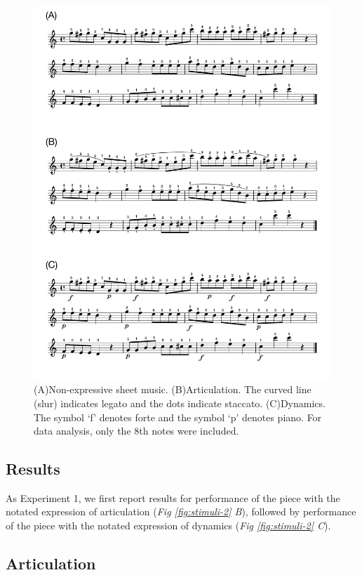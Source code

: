 \documentclass[
  english,
  man,floatsintext]{apa6}
\begin{document}
\begin{figure}
\includegraphics[width=1\linewidth]{manuscript_files/figure-latex/stim-2-1} \caption{\label{fig:stimuli-2}(A)Non-expressive sheet music. (B)Articulation. The curved line (slur) indicates legato and the dots indicate staccato. (C)Dynamics. The symbol `f' denotes forte and the symbol `p' denotes piano. For data analysis, only the 8th notes were included.}\label{fig:stim-2}
\end{figure}

\hypertarget{results-1}{%
\subsection{Results}\label{results-1}}

As Experiment 1, we first report results for performance of the piece with the notated expression of articulation (\emph{Fig \ref{fig:stimuli-2} B}), followed by performance of the piece with the notated expression of dynamics (\emph{Fig \ref{fig:stimuli-2} C}).

\hypertarget{articulation-1}{%
\subsection{Articulation}\label{articulation-1}}
\end{document}

